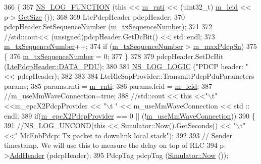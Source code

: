 \begin{DoxyCode}
366 \{
367   \hyperlink{log-macros-disabled_8h_a90b90d5bad1f39cb1b64923ea94c0761}{NS\_LOG\_FUNCTION} (\textcolor{keyword}{this} << \hyperlink{classns3_1_1McEnbPdcp_aff9ff9c543196c0745b2f9bc4347b968}{m\_rnti} << (uint32\_t) \hyperlink{classns3_1_1McEnbPdcp_a7bed538d407d2fad4bd939d95da02685}{m\_lcid} << p->
      \hyperlink{classns3_1_1Packet_a462855c9929954d4301a4edfe55f4f1c}{GetSize} ());
368 
369   LtePdcpHeader pdcpHeader;
370   pdcpHeader.SetSequenceNumber (\hyperlink{classns3_1_1McEnbPdcp_a6676f6c8dcf6b98eb9692549607473e7}{m\_txSequenceNumber});
371 
372 \textcolor{comment}{//std::cout<< (unsigned)pdcpHeader.GetDcBit() << std::endl;}
373   \hyperlink{classns3_1_1McEnbPdcp_a6676f6c8dcf6b98eb9692549607473e7}{m\_txSequenceNumber}++;
374   \textcolor{keywordflow}{if} (\hyperlink{classns3_1_1McEnbPdcp_a6676f6c8dcf6b98eb9692549607473e7}{m\_txSequenceNumber} > \hyperlink{classns3_1_1McEnbPdcp_aec518036b2245a6b6abe772f95439cfd}{m\_maxPdcpSn})
375     \{
376       \hyperlink{classns3_1_1McEnbPdcp_a6676f6c8dcf6b98eb9692549607473e7}{m\_txSequenceNumber} = 0;
377     \}
378 
379   pdcpHeader.SetDcBit (\hyperlink{classns3_1_1LtePdcpHeader_a3a965023a8f37aad003904c3d64d7ffda5cd4f8c2bc8e87cfae1e626fef42c3d7}{LtePdcpHeader::DATA\_PDU});
380 
381   \hyperlink{group__logging_ga88acd260151caf2db9c0fc84997f45ce}{NS\_LOG\_LOGIC} (\textcolor{stringliteral}{"PDCP header: "} << pdcpHeader);
382 
383 
384   LteRlcSapProvider::TransmitPdcpPduParameters params;
385   params.rnti = \hyperlink{classns3_1_1McEnbPdcp_aff9ff9c543196c0745b2f9bc4347b968}{m\_rnti};
386   params.lcid = \hyperlink{classns3_1_1McEnbPdcp_a7bed538d407d2fad4bd939d95da02685}{m\_lcid};
387 \textcolor{comment}{//m\_useMmWaveConnection=true;}
388   \textcolor{comment}{//std::cout << this <<"\(\backslash\)t" <<m\_epcX2PdcpProvider << "\(\backslash\)t "  << m\_useMmWaveConnection << std :: endl;}
389   \textcolor{keywordflow}{if}(\hyperlink{classns3_1_1McEnbPdcp_aff328b08ea32259fd2859927a89d280f}{m\_epcX2PdcpProvider} == 0 || (!\hyperlink{classns3_1_1McEnbPdcp_a6cbdfb0b27f6ff6d16c1b5809df73613}{m\_useMmWaveConnection}))
390   \{
391     \textcolor{comment}{//NS\_LOG\_UNCOND(this << Simulator::Now().GetSeconds() << "\(\backslash\)t" <<" McEnbPdcp: Tx packet to downlink
       local stack");}
392 
393     \textcolor{comment}{// Sender timestamp. We will use this to measure the delay on top of RLC}
394           p->\hyperlink{classns3_1_1Packet_a465108c595a0bc592095cbcab1832ed8}{AddHeader} (pdcpHeader);
395     PdcpTag pdcpTag (\hyperlink{classns3_1_1Simulator_ac3178fa975b419f7875e7105be122800}{Simulator::Now} ());

\end{DoxyCode}
